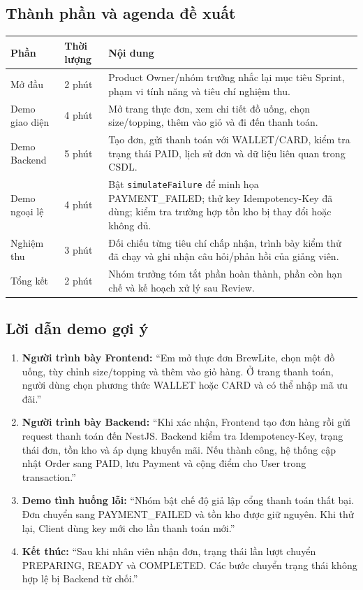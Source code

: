 \subsection{Thành phần và agenda đề xuất}

\begin{center}
\renewcommand{\arraystretch}{1.2}
\begin{tabular}{|p{2.5cm}|p{2.0cm}|p{8.8cm}|}
\hline
\textbf{Phần} & \textbf{Thời lượng} & \textbf{Nội dung} \\
\hline
Mở đầu & 2 phút & Product Owner/nhóm trưởng nhắc lại mục tiêu Sprint, phạm vi tính năng và tiêu chí nghiệm thu. \\
\hline
Demo giao diện & 4 phút & Mở trang thực đơn, xem chi tiết đồ uống, chọn size/topping, thêm vào giỏ và đi đến thanh toán. \\
\hline
Demo Backend & 5 phút & Tạo đơn, gửi thanh toán với WALLET/CARD, kiểm tra trạng thái PAID, lịch sử đơn và dữ liệu liên quan trong CSDL. \\
\hline
Demo ngoại lệ & 4 phút & Bật \texttt{simulateFailure} để minh họa PAYMENT\_FAILED; thử key Idempotency-Key đã dùng; kiểm tra trường hợp tồn kho bị thay đổi hoặc không đủ. \\
\hline
Nghiệm thu & 3 phút & Đối chiếu từng tiêu chí chấp nhận, trình bày kiểm thử đã chạy và ghi nhận câu hỏi/phản hồi của giảng viên. \\
\hline
Tổng kết & 2 phút & Nhóm trưởng tóm tắt phần hoàn thành, phần còn hạn chế và kế hoạch xử lý sau Review. \\
\hline
\end{tabular}
\end{center}

\subsection{Lời dẫn demo gợi ý}

\begin{enumerate}
    \item \textbf{Người trình bày Frontend:} ``Em mở thực đơn BrewLite, chọn một đồ uống, tùy chỉnh size/topping và thêm vào giỏ hàng. Ở trang thanh toán, người dùng chọn phương thức WALLET hoặc CARD và có thể nhập mã ưu đãi.''
    \item \textbf{Người trình bày Backend:} ``Khi xác nhận, Frontend tạo đơn hàng rồi gửi request thanh toán đến NestJS. Backend kiểm tra Idempotency-Key, trạng thái đơn, tồn kho và áp dụng khuyến mãi. Nếu thành công, hệ thống cập nhật Order sang PAID, lưu Payment và cộng điểm cho User trong transaction.''
    \item \textbf{Demo tình huống lỗi:} ``Nhóm bật chế độ giả lập cổng thanh toán thất bại. Đơn chuyển sang PAYMENT\_FAILED và tồn kho được giữ nguyên. Khi thử lại, Client dùng key mới cho lần thanh toán mới.''
    \item \textbf{Kết thúc:} ``Sau khi nhân viên nhận đơn, trạng thái lần lượt chuyển PREPARING, READY và COMPLETED. Các bước chuyển trạng thái không hợp lệ bị Backend từ chối.''
\end{enumerate}

